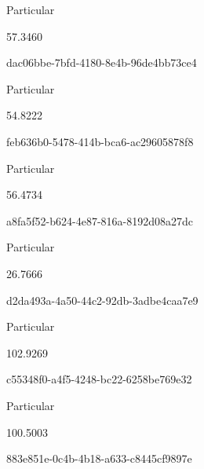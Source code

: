 \documentclass[
  11pt,
  a4paper,
  DIV=11,
  numbers=noendperiod]{scrartcl}
\begin{document}
\n      

Particular

\n      

57.3460

\n    

\n    

\n      

dac06bbe-7bfd-4180-8e4b-96de4bb73ce4

\n      

Particular

\n      

54.8222

\n    

\n    

\n      

feb636b0-5478-414b-bca6-ac29605878f8

\n      

Particular

\n      

56.4734

\n    

\n    

\n      

a8fa5f52-b624-4e87-816a-8192d08a27dc

\n      

Particular

\n      

26.7666

\n    

\n    

\n      

d2da493a-4a50-44c2-92db-3adbe4caa7e9

\n      

Particular

\n      

102.9269

\n    

\n    

\n      

c55348f0-a4f5-4248-bc22-6258be769e32

\n      

Particular

\n      

100.5003

\n    

\n    

\n      

883e851e-0c4b-4b18-a633-c8445cf9897e

\n      
\end{document}
